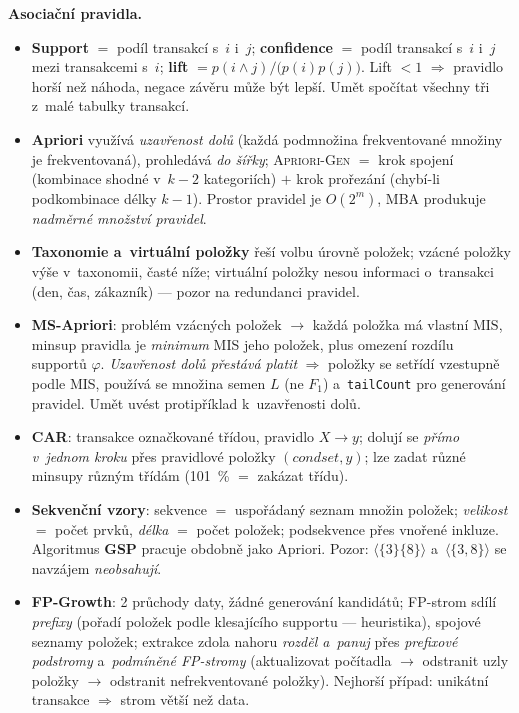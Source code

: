 \documentclass[11pt,a4paper]{article}
\theoremstyle{definition}
\begin{document}
\textbf{Asociační pravidla.}
\begin{itemize}
\item \textbf{Support} $=$ podíl transakcí s~$i$ i~$j$; \textbf{confidence} $=$ podíl
      transakcí s~$i$ i~$j$ mezi transakcemi s~$i$; \textbf{lift}
      $=p(i\wedge j)/\big(p(i)p(j)\big)$. Lift $<1$ $\Rightarrow$ pravidlo horší než náhoda,
      negace závěru může být lepší. Umět spočítat všechny tři z~malé tabulky transakcí.
\item \textbf{Apriori} využívá \emph{uzavřenost dolů} (každá podmnožina frekventované množiny
      je frekventovaná), prohledává \emph{do šířky}; \textsc{Apriori-Gen} $=$ krok spojení
      (kombinace shodné v~$k-2$ kategoriích) $+$ krok prořezání (chybí-li podkombinace délky
      $k-1$). Prostor pravidel je $O(2^m)$, MBA produkuje \emph{nadměrné množství pravidel}.
\item \textbf{Taxonomie a~virtuální položky} řeší volbu úrovně položek; vzácné položky výše
      v~taxonomii, časté níže; virtuální položky nesou informaci o~transakci (den, čas,
      zákazník) --- pozor na redundanci pravidel.
\item \textbf{MS-Apriori}: problém vzácných položek $\to$ každá položka má vlastní
      $\mathrm{MIS}$, minsup pravidla je \emph{minimum} MIS jeho položek, plus omezení
      rozdílu supportů $\varphi$. \emph{Uzavřenost dolů přestává platit} $\Rightarrow$ položky
      se setřídí vzestupně podle MIS, používá se množina semen $L$ (ne $F_1$)
      a~\texttt{tailCount} pro generování pravidel. Umět uvést protipříklad k~uzavřenosti dolů.
\item \textbf{CAR}: transakce označkované třídou, pravidlo $X\to y$; dolují se
      \emph{přímo v~jednom kroku} přes pravidlové položky $(\mathit{condset},y)$; lze zadat
      různé minsupy různým třídám (101~\% $=$ zakázat třídu).
\item \textbf{Sekvenční vzory}: sekvence $=$ uspořádaný seznam množin položek;
      \emph{velikost} $=$ počet prvků, \emph{délka} $=$ počet položek; podsekvence přes
      vnořené inkluze. Algoritmus \textbf{GSP} pracuje obdobně jako Apriori. Pozor:
      $\langle\{3\}\{8\}\rangle$ a~$\langle\{3,8\}\rangle$ se navzájem \emph{neobsahují}.
\item \textbf{FP-Growth}: 2 průchody daty, žádné generování kandidátů; FP-strom sdílí
      \emph{prefixy} (pořadí položek podle klesajícího supportu --- heuristika), spojové
      seznamy položek; extrakce zdola nahoru \emph{rozděl a~panuj} přes \emph{prefixové
      podstromy} a~\emph{podmíněné FP-stromy} (aktualizovat počítadla $\to$ odstranit uzly
      položky $\to$ odstranit nefrekventované položky). Nejhorší případ: unikátní transakce
      $\Rightarrow$ strom větší než data.
\end{itemize}
\end{document}
